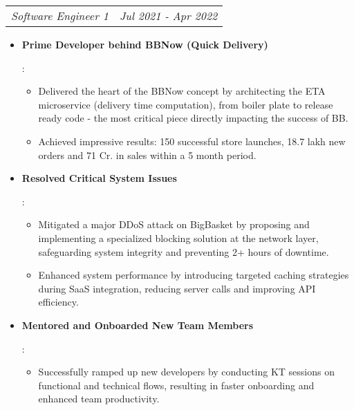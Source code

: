 \documentclass[letterpaper,11pt]{article}
\makeatletter
\newcommand{\resumeItem}[2]{
  \item\small{
    \textbf{#1}{: #2 \vspace{-2pt}}
  }
}
\newcommand{\resumeSubSubheading}[2]{
    \begin{tabular*}{0.97\textwidth}{l@{\extracolsep{\fill}}r}
      \textit{\small#1} & \textit{\small #2} \\
    \end{tabular*}\vspace{-5pt}
}
\newcommand{\resumeSubHeadingListEnd}{\end{itemize}}
\newcommand{\resumeItemListStart}{\begin{itemize}}
\newcommand{\resumeItemListEnd}{\end{itemize}\vspace{-5pt}}
\makeatother
\begin{document}
   \resumeSubSubheading
    {Software Engineer 1}{Jul 2021 - Apr 2022}
    \resumeItemListStart
      \resumeItem{Prime Developer behind BBNow (Quick Delivery)}
      {
        \begin{itemize} %
          \item  Delivered the heart of the BBNow concept by architecting the ETA microservice (delivery time computation), from boiler plate to release ready code - the most critical piece directly impacting the success of BB.
          \item Achieved impressive results: 150 successful store launches, 18.7 lakh new orders and 71 Cr. in sales within a 5 month period.    
        \end{itemize}
      }
      \resumeItem{Resolved Critical System Issues}
      {
        \begin{itemize} %
          \item Mitigated a major DDoS attack on BigBasket by proposing and implementing a specialized blocking solution at the network layer, safeguarding system integrity and preventing 2+ hours of downtime.
          \item  Enhanced system performance by introducing targeted caching strategies during SaaS integration, reducing server calls and improving API efficiency.
        \end{itemize}
      }
      \resumeItem{Mentored and Onboarded New Team Members}
      {
        \begin{itemize} %
          \item Successfully ramped up new developers by conducting KT sessions on functional and technical flows, resulting in faster onboarding and enhanced team productivity.
        \end{itemize}
      }
    \resumeItemListEnd
\end{document}
